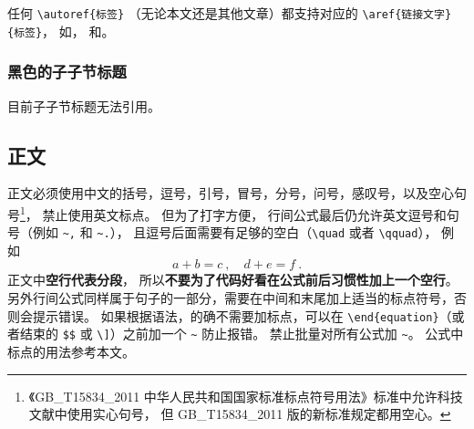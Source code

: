 任何 \verb`\autoref{标签}` （无论本文还是其他文章）都支持对应的 \verb`\aref{链接文字}{标签}`， 如， 和。

\subsubsection{黑色的子子节标题}
目前子子节标题无法引用。

\subsection{正文}\label{sub_Sample_16}
正文必须使用中文的括号，逗号，引号，冒号，分号，问号，感叹号，以及空心句号\footnote{《GB\_T15834\_2011 中华人民共和国国家标准标点符号用法》标准中允许科技文献中使用实心句号， 但 GB\_T15834\_2011 版的新标准规定都用空心。}， 禁止使用英文标点。 但为了打字方便， 行间公式最后仍允许英文逗号和句号（例如 \verb`~,` 和 \verb`~.`）， 且逗号后面需要有足够的空白（\verb`\quad` 或者 \verb`\qquad`）， 例如
\begin{equation}\label{eq_Sample_2}
a + b = c~, \quad d + e = f~.
\end{equation}
正文中\textbf{空行代表分段}， 所以\textbf{不要为了代码好看在公式前后习惯性加上一个空行}。 另外行间公式同样属于句子的一部分，需要在中间和末尾加上适当的标点符号，否则会提示错误。 如果根据语法，的确不需要加标点，可以在 \verb`\end{equation}`（或者结束的 \verb`$$` 或 \verb`\]`）之前加一个 \verb`~` 防止报错。 禁止批量对所有公式加 \verb`~`。 公式中标点的用法参考本文。

